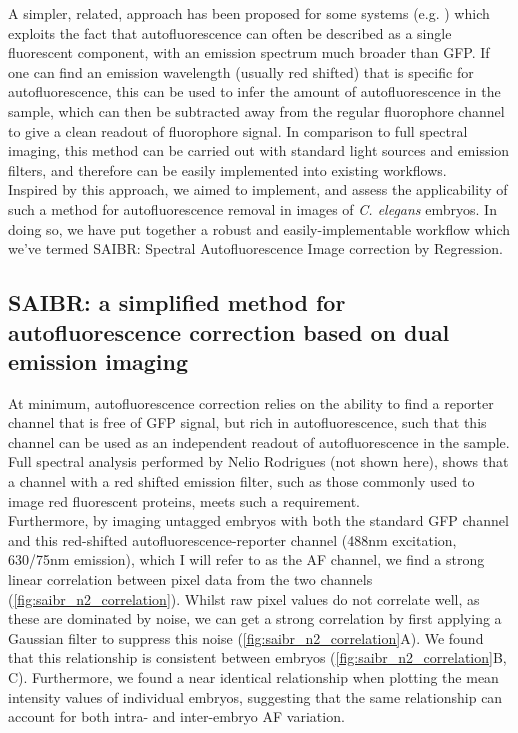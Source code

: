 \documentclass[12pt]{"report"}
\begin{document}
A simpler, related, approach has been proposed for some systems (e.g. \cite{Roederer1986}) which exploits the fact that autofluorescence can often be described as a single fluorescent component, with an emission spectrum much broader than GFP. If one can find an emission wavelength (usually red shifted) that is specific for autofluorescence, this can be used to infer the amount of autofluorescence in the sample, which can then be subtracted away from the regular fluorophore channel to give a clean readout of fluorophore signal. In comparison to full spectral imaging, this method can be carried out with standard light sources and emission filters, and therefore can be easily implemented into existing workflows.\\

Inspired by this approach, we aimed to implement, and assess the applicability of such a method for autofluorescence removal in images of \textit{C. elegans} embryos. In doing so, we have put together a robust and easily-implementable workflow which we’ve termed SAIBR: Spectral Autofluorescence Image correction by Regression.\\


\subsection{SAIBR: a simplified method for autofluorescence correction based on dual emission imaging}


At minimum, autofluorescence correction relies on the ability to find a reporter channel that is free of GFP signal, but rich in autofluorescence, such that this channel can be used as an independent readout of autofluorescence in the sample. Full spectral analysis performed by Nelio Rodrigues (not shown here), shows that a channel with a red shifted emission filter, such as those commonly used to image red fluorescent proteins, meets such a requirement.\\

Furthermore, by imaging untagged embryos with both the standard GFP channel and this red-shifted autofluorescence-reporter channel (488nm excitation, 630/75nm emission), which I will refer to as the AF channel, we find a strong linear correlation between pixel data from the two channels (\cref{fig:saibr_n2_correlation}). Whilst raw pixel values do not correlate well, as these are dominated by noise, we can get a strong correlation by first applying a Gaussian filter to suppress this noise (\cref{fig:saibr_n2_correlation}A). We found that this relationship is consistent between embryos (\cref{fig:saibr_n2_correlation}B, C). Furthermore, we found a near identical relationship when plotting the mean intensity values of individual embryos, suggesting that the same relationship can account for both intra- and inter-embryo AF variation. \\
\end{document}
